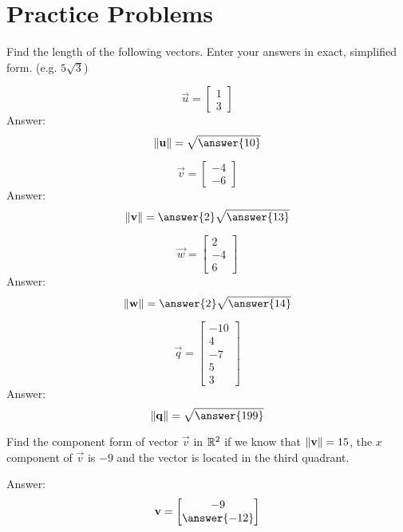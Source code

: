 \documentclass{ximera}
\begin{document}
\section*{Practice Problems}
\begin{problem}\label{prob:magnitude}
Find the length of the following vectors.  Enter your answers in exact, simplified form. (e.g. $5\sqrt{3}$)
\begin{problem}\label{prob:magnitude1}
 $$\vec{u}=\begin{bmatrix}1\\3\end{bmatrix}$$ 
 Answer:
 $$\norm{\vec{u}}=\sqrt{\answer{10}}$$
 \end{problem}
 
 \begin{problem}\label{prob:magnitude2}
 $$\vec{v}=\begin{bmatrix}-4\\-6\end{bmatrix}$$
 Answer:
 $$\norm{\vec{v}}=\answer{2}\sqrt{\answer{13}}$$
 \end{problem}
 
 \begin{problem}\label{prob:magnitude3}
 $$\vec{w}=\begin{bmatrix}2\\-4\\6\end{bmatrix}$$
 Answer:
 $$\norm{\vec{w}}=\answer{2}\sqrt{\answer{14}}$$
 \end{problem}
 
 \begin{problem}\label{prob:magnitude4}
 $$\vec{q}=\begin{bmatrix}-10\\ 4\\ -7\\ 5\\ 3\end{bmatrix}$$
 Answer:
 $$\norm{\vec{q}}=\sqrt{\answer{199}}$$
 \end{problem}
 \end{problem}
 
\begin{problem}\label{prob:compformgivenmag}
Find the component form of vector $\vec{v}$ in $\mathbb{R}^2$ if we know that $\left\lVert\mathbf{v}\right\rVert=15$, the $x$ component of $\vec{v}$ is $-9$ and the vector is located in the third quadrant.

Answer:
$$\vec{v}=\begin{bmatrix}-9\\\answer{-12}\end{bmatrix}$$
\end{problem}
\end{document}
